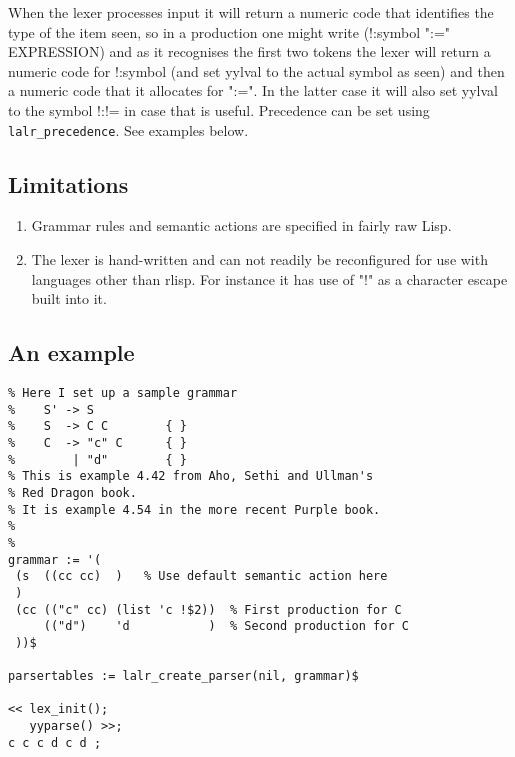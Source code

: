 When the lexer processes input it will return a numeric code that identifies
the type of the item seen, so in a production one might write
    (!:symbol ":=" EXPRESSION)
and as it recognises the first two tokens the lexer will return a numeric
code for !:symbol (and set yylval to the actual symbol as seen) and then
a numeric code that it allocates for ":=". In the latter case it will
also set yylval to the symbol !:!= in case that is useful.
%
Precedence can be set using \texttt{lalr\_precedence}. See examples below.



\subsection{Limitations}
\begin{enumerate}
\item Grammar rules and semantic actions are specified in fairly raw Lisp.
\item The lexer is hand-written and can not readily be reconfigured for
    use with languages other than rlisp. For instance it has use of "!"
    as a character escape built into it.
\end{enumerate}


\subsection{An example}
\begin{verbatim}
% Here I set up a sample grammar
%    S' -> S
%    S  -> C C        { }
%    C  -> "c" C      { }
%        | "d"        { }
% This is example 4.42 from Aho, Sethi and Ullman's
% Red Dragon book.
% It is example 4.54 in the more recent Purple book.
%
%
grammar := '(
 (s  ((cc cc)  )   % Use default semantic action here
 )
 (cc (("c" cc) (list 'c !$2))  % First production for C
     (("d")    'd           )  % Second production for C
 ))$

parsertables := lalr_create_parser(nil, grammar)$

<< lex_init();
   yyparse() >>;
c c c d c d ;
\end{verbatim}

\endinput


A grammar is given as a list of rules. Each rule has a single non-terminal
and then a seqence of productions for it. Each production can optionally
be provided with an associated semantic action.


